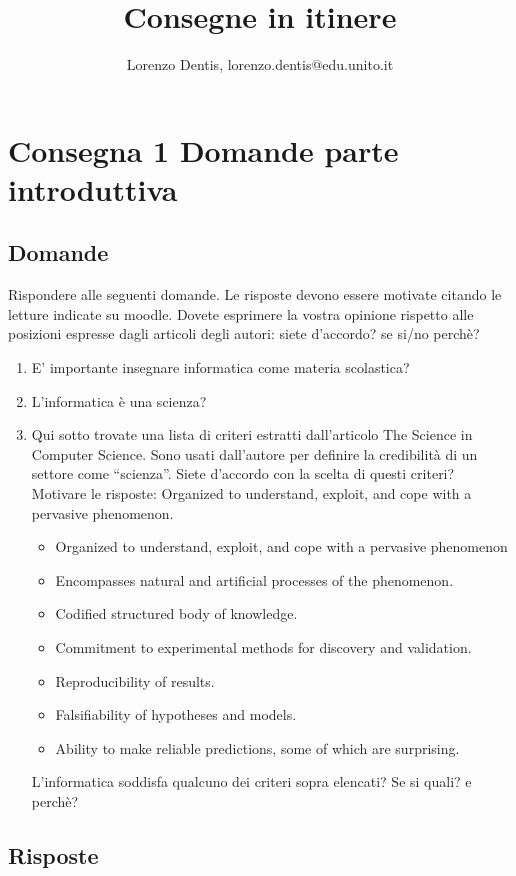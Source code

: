 \documentclass[a4paper]{article}
\begin{document}
\author{Lorenzo Dentis, lorenzo.dentis@edu.unito.it}
\title{Consegne in itinere}
\maketitle

\section{Consegna 1 \large Domande parte introduttiva}

\subsection{Domande}
Rispondere alle seguenti domande. Le risposte devono essere motivate citando le letture indicate su moodle. Dovete esprimere la vostra opinione  rispetto alle posizioni espresse dagli articoli degli autori: siete d’accordo? se si/no perchè?
\newline
\begin{enumerate}
	\item E’ importante insegnare informatica come materia scolastica?
	\item L’informatica è una scienza?
	\item Qui sotto trovate una lista di criteri estratti dall’articolo The Science in Computer Science. Sono usati dall’autore per definire la credibilità di un settore come “scienza”. Siete d’accordo con la scelta di questi criteri? Motivare le risposte:
Organized to understand, exploit, and cope with a pervasive phenomenon.
\begin{itemize}
	\item Organized to understand, exploit, and cope with a pervasive phenomenon
	\item Encompasses natural and artificial processes of the phenomenon.
	\item Codified structured body of knowledge.
	\item Commitment to experimental methods for discovery and validation.
	\item Reproducibility of results.
	\item Falsifiability of hypotheses and models.
	\item Ability to make reliable predictions, some of which are surprising.
\end{itemize}
	L’informatica soddisfa qualcuno dei criteri sopra elencati? Se si quali? e perchè?
\end{enumerate}
\newpage
\subsection{Risposte}
\end{document}

